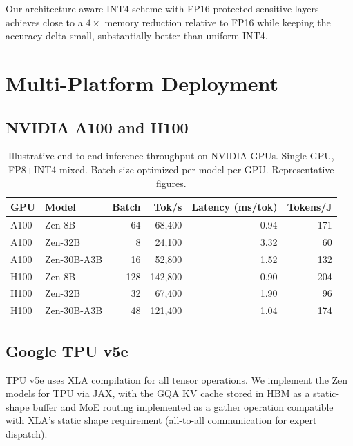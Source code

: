\documentclass[11pt,a4paper]{article}
\begin{document}
Our architecture-aware INT4 scheme with FP16-protected sensitive layers achieves close to
a $4\times$ memory reduction relative to FP16 while keeping the accuracy delta small,
substantially better than uniform INT4.

\section{Multi-Platform Deployment}
\label{sec:platforms}

\subsection{NVIDIA A100 and H100}

\begin{table}[H]
\centering
\caption{Illustrative end-to-end inference throughput on NVIDIA GPUs. Single GPU, FP8+INT4 mixed.
Batch size optimized per model per GPU. Representative figures.}
\begin{tabular}{llrrrr}
\toprule
\textbf{GPU} & \textbf{Model} & \textbf{Batch} & \textbf{Tok/s} & \textbf{Latency (ms/tok)} & \textbf{Tokens/J} \\
\midrule
A100 & Zen-8B       & 64  & 68,400  & 0.94  & 171 \\
A100 & Zen-32B      & 8   & 24,100  & 3.32  & 60  \\
A100 & Zen-30B-A3B  & 16  & 52,800  & 1.52  & 132 \\
H100 & Zen-8B       & 128 & 142,800 & 0.90  & 204 \\
H100 & Zen-32B      & 32  & 67,400  & 1.90  & 96  \\
H100 & Zen-30B-A3B  & 48  & 121,400 & 1.04  & 174 \\
\bottomrule
\end{tabular}
\label{tab:gpu_throughput}
\end{table}

\subsection{Google TPU v5e}

TPU v5e uses XLA compilation for all tensor operations. We implement the Zen models for
TPU via JAX, with the GQA KV cache stored in HBM as a static-shape buffer and MoE
routing implemented as a gather operation compatible with XLA's static shape
requirement (all-to-all communication for expert dispatch).
\end{document}
